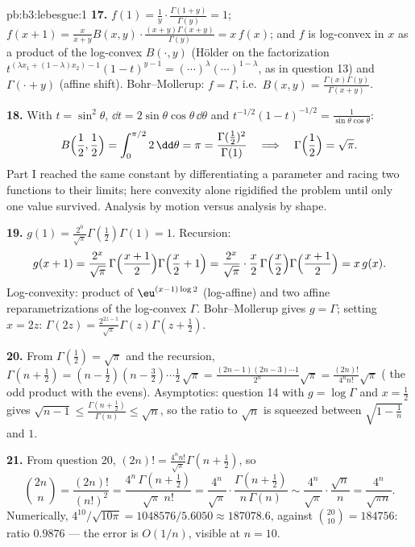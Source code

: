 \begin{solution}{pb:b3:lebesgue:1}
\textbf{17.} $f(1) = \frac1y\cdot\frac{\Gamma(1+y)}{\Gamma(y)}
= 1$; $f(x+1) = \frac{x}{x+y}B(x,y)\cdot\frac{(x+y)\Gamma(x+y)}
{\Gamma(y)} = x\,f(x)$; and $f$ is log-convex in $x$ as a
product of the log-convex $B(\cdot, y)$ (H\"older on the
factorization $t^{(\lambda x_1 + (1-\lambda)x_2)-1}(1-t)^{y-1}
= (\cdots)^\lambda(\cdots)^{1-\lambda}$, as in question 13)
and $\Gamma(\cdot + y)$ (affine shift). Bohr--Mollerup: $f =
\Gamma$, i.e.\ $B(x, y) =
\frac{\Gamma(x)\Gamma(y)}{\Gamma(x+y)}$.

\textbf{18.} With $t = \sin^2\theta$, $\dd t =
2\sin\theta\cos\theta\,\dd\theta$ and $t^{-1/2}(1-t)^{-1/2} =
\frac1{\sin\theta\cos\theta}$:
\[
B\Bigl(\frac12, \frac12\Bigr) =
\int_0^{\pi/2}2\,\dd\theta = \pi
= \frac{\Gamma(\frac12)^2}{\Gamma(1)}
\quad\Longrightarrow\quad
\Gamma\Bigl(\frac12\Bigr) = \sqrt\pi .
\]
Part I reached the same constant by differentiating a
parameter and racing two functions to their limits; here
convexity alone rigidified the problem until only one value
survived. Analysis by motion versus analysis by shape.

\textbf{19.} $g(1) = \frac{2^0}{\sqrt\pi}\Gamma(\frac12)
\Gamma(1) = 1$. Recursion:
\[
g(x+1) = \frac{2^{x}}{\sqrt\pi}\,
\Gamma\Bigl(\frac{x+1}2\Bigr)\Gamma\Bigl(\frac x2 + 1\Bigr)
= \frac{2^{x}}{\sqrt\pi}\cdot\frac x2\,
\Gamma\Bigl(\frac x2\Bigr)\Gamma\Bigl(\frac{x+1}2\Bigr)
= x\,g(x) .
\]
Log-convexity: product of $\eu^{(x-1)\log2}$ (log-affine) and
two affine reparametrizations of the log-convex $\Gamma$.
Bohr--Mollerup gives $g = \Gamma$; setting $x = 2z$:
$\Gamma(2z) = \frac{2^{2z-1}}{\sqrt\pi}\Gamma(z)\Gamma(z +
\frac12)$.

\textbf{20.} From $\Gamma(\frac12) = \sqrt\pi$ and the
recursion, $\Gamma(n + \frac12) = (n - \frac12)(n -
\frac32)\cdots\frac12\,\sqrt\pi =
\frac{(2n-1)(2n-3)\cdots1}{2^n}\sqrt\pi =
\frac{(2n)!}{4^nn!}\sqrt\pi$ ( the odd product with
the evens). Asymptotics: question 14 with $g = \log\Gamma$
and $x = \frac12$ gives $\sqrt{n-1} \leq
\frac{\Gamma(n+\frac12)}{\Gamma(n)} \leq \sqrt n$, so the
ratio to $\sqrt n$ is squeezed between $\sqrt{1 - \frac1n}$
and $1$.

\textbf{21.} From question 20, $(2n)! =
\frac{4^nn!}{\sqrt\pi}\Gamma(n + \tfrac12)$, so
\[
\binom{2n}n = \frac{(2n)!}{(n!)^2}
= \frac{4^n\,\Gamma(n+\frac12)}{\sqrt\pi\;n!}
= \frac{4^n}{\sqrt\pi}\cdot
\frac{\Gamma(n+\frac12)}{n\,\Gamma(n)}
\sim \frac{4^n}{\sqrt\pi}\cdot\frac{\sqrt n}{n}
= \frac{4^n}{\sqrt{\pi n}} .
\]
Numerically, $4^{10}/\sqrt{10\pi} = 1048576/5.6050 \approx
187078.6$, against $\binom{20}{10} = 184756$: ratio $0.9876$
--- the error is $O(1/n)$, visible at $n = 10$.


\end{solution}

